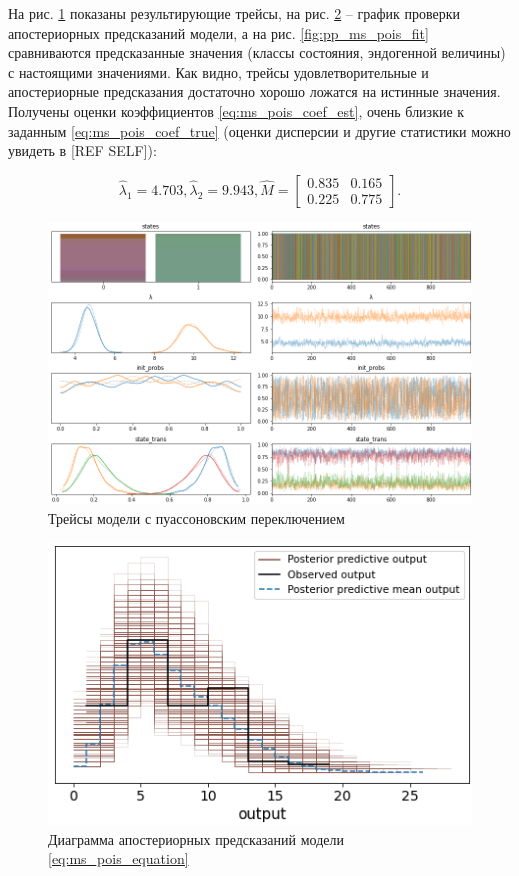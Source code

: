 \documentclass[a4paper,14pt]{extreport}
\begin{document}
На рис. \ref{fig:pp_ms_pois_trace} показаны результирующие трейсы, на рис.  \ref{fig:pp_ms_pois_ppc} -- график проверки апостериорных предсказаний модели, а на рис. \ref{fig:pp_ms_pois_fit} сравниваются предсказанные значения (классы состояния, эндогенной величины) с настоящими значениями. Как видно, трейсы удовлетворительные и апостериорные предсказания достаточно хорошо ложатся на истинные значения. Получены оценки коэффициентов \ref{eq:ms_pois_coef_est}, очень близкие к заданным \ref{eq:ms_pois_coef_true} (оценки дисперсии и другие статистики можно увидеть в [REF SELF]):

\begin{equation}
	\hat{\lambda}_1 = 4.703, 
	\hat{\lambda}_2 = 9.943,
	\hat{M}= \left[ {\begin{array}{cc}
					0.835 & 0.165 \\
					0.225 & 0.775
				\end{array} } \right]
	.
	\label{eq:ms_pois_coef_est}
\end{equation}

\begin{figure}[H]
	\includegraphics[width=\linewidth]{img/gen/pp_ms_pois_trace.png}
	\caption{Трейсы модели с пуассоновским переключением}
	\label{fig:pp_ms_pois_trace}
\end{figure}

\begin{figure}[H]
	\includegraphics[width=\linewidth]{img/gen/pp_ms_pois_ppc.png}
	\caption{Диаграмма апостериорных предсказаний модели \ref{eq:ms_pois_equation}}
	\label{fig:pp_ms_pois_ppc}
\end{figure}
\end{document}
